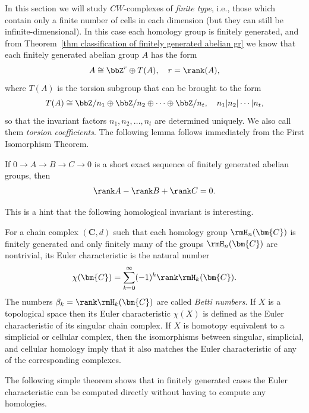 In this section we will study $CW$-complexes of \emph{finite type}, i.e., those which contain only a finite number of cells in each dimension (but they can still be infinite-dimensional). In this case each homology group is finitely generated, and from Theorem~\ref{thm classification of finitely generated abelian gr} we know that each finitely generated abelian group $A$ has the form
\[A\cong \bbZ^r\oplus T(A),\quad r=\rank(A),\]
where $T(A)$ is the torsion subgroup that can be brought to the form
\[T(A)\cong \bbZ/n_1\oplus \bbZ/n_2\oplus \cdots \oplus \bbZ/n_t,\quad n_1|n_2|\cdots |n_t,\]
so that the invariant factors $n_1,n_2,\ldots,n_t$ are determined uniquely. We also call them \emph{torsion coefficients}. The following lemma follows immediately from the First Isomorphism Theorem.

\begin{lem}
    If $0\to A\to B\to C\to 0$ is a short exact sequence of finitely generated abelian groups, then
    \[\rank A-\rank B+\rank C=0.\]
\end{lem}

This is a hint that the following homological invariant is interesting.

\begin{defn}
    For a chain complex $(\bm{C},d)$ such that each homology group $\rmH_n(\bm{C})$ is finitely generated and only finitely many of the groups $\rmH_n(\bm{C})$ are nontrivial, its Euler characteristic is the natural number
    \[\chi(\bm{C})=\sum_{k=0}^\infty (-1)^k \rank \rmH_k(\bm{C}).\]
    The numbers $\beta_k=\rank \rmH_k(\bm{C})$ are called \emph{Betti numbers}.
    If $X$ is a topological space then its Euler characteristic $\chi(X)$ is defined as the Euler characteristic of its singular chain complex. If $X$ is homotopy equivalent to a simplicial or cellular complex, then the isomorphisms between singular, simplicial, and cellular homology imply that it also matches the Euler characteristic of any of the corresponding complexes.
\end{defn}

The following simple theorem shows that in finitely generated cases the Euler characteristic can be computed directly without having to compute any homologies.

